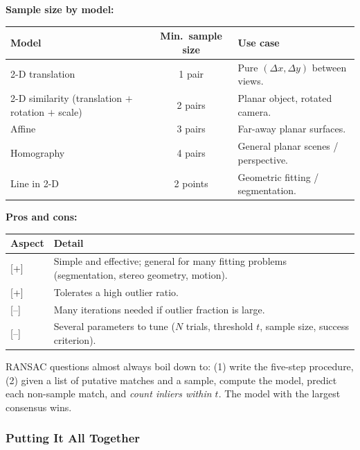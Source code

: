 \textbf{Sample size by model:}
\begin{center}
\renewcommand{\arraystretch}{1.3}
\begin{tabular}{@{} l c p{6cm} @{}}
\toprule
\textbf{Model} & \textbf{Min.\ sample size} & \textbf{Use case} \\
\midrule
2-D translation & 1 pair & Pure $(\Delta x, \Delta y)$ between views. \\
2-D similarity (translation $+$ rotation $+$ scale) & 2 pairs & Planar object, rotated camera. \\
Affine & 3 pairs & Far-away planar surfaces. \\
Homography & 4 pairs & General planar scenes / perspective. \\
Line in 2-D & 2 points & Geometric fitting / segmentation. \\
\bottomrule
\end{tabular}
\end{center}

\textbf{Pros and cons:}
\begin{center}
\renewcommand{\arraystretch}{1.3}
\begin{tabular}{@{} l p{9cm} @{}}
\toprule
\textbf{Aspect} & \textbf{Detail} \\
\midrule
{[+]} & Simple and effective; general for many fitting problems (segmentation, stereo geometry, motion). \\
{[+]} & Tolerates a high outlier ratio. \\
{[--]} & Many iterations needed if outlier fraction is large. \\
{[--]} & Several parameters to tune ($N$ trials, threshold $t$, sample size, success criterion). \\
\bottomrule
\end{tabular}
\end{center}

\begin{tipbox}
RANSAC questions almost always boil down to: (1) write the five-step procedure, (2) given a list of putative matches and a sample, compute the model, predict each non-sample match, and \emph{count inliers within $t$}. The model with the largest consensus wins.
\end{tipbox}

\bigseparator

\subsubsection{Putting It All Together}

